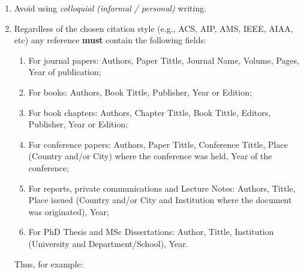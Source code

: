 \documentclass[14pt,twoside]{report}
\begin{document}
\begin{enumerate}
\begin{enumerate}
%
%
\item Avoid using {\it colloquial (informal / personal)} writing.
%
\item Regardless of the chosen citation style (e.g., ACS, AIP, AMS, IEEE, AIAA, etc) any reference {\bf must} contain the following fields: 
\begin{enumerate}
\item For journal papers: Authors, Paper Tittle, Journal Name, Volume, Pages, Year of publication;
\item For books: Authors, Book Tittle, Publisher, Year or Edition;
\item For book chapters: Authors, Chapter Tittle, Book Tittle, Editors, Publisher, Year or Edition;
\item For conference papers: Authors, Paper Tittle, Conference Tittle, Place (Country and/or City) where the conference was held, Year of the conference;
\item For reports,  private communications and Lecture Notes: Authors, Tittle, Place issued (Country and/or City and Institution where the document was originated), Year;
\item For PhD Thesis and MSc Dissertations: Author, Tittle, Institution (University and Department/School), Year.
\end{enumerate}  
Thus, for example:
%
\end{enumerate}


\end{enumerate}
\end{document}
